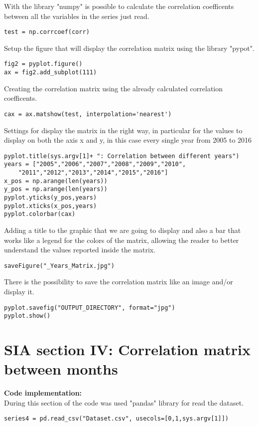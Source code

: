 With the library "numpy" is possible to calculate the correlation coefficents between all the variables in the series just read.
\begin{lstlisting}
test = np.corrcoef(corr)
\end{lstlisting}

Setup the figure that will display the correlation matrix using the library "pypot".
\begin{lstlisting}
fig2 = pyplot.figure()
ax = fig2.add_subplot(111)
\end{lstlisting}

Creating the correlation matrix using the already calculated correlation coefficents.
\begin{lstlisting}
cax = ax.matshow(test, interpolation='nearest')
\end{lstlisting}

Settings for display the matrix in the right way, in particular for the values to display on both the axis x and y, in this case every single year from 2005 to 2016
\begin{lstlisting}
pyplot.title(sys.argv[1]+ ": Correlation between different years")
years = ["2005","2006","2007","2008","2009","2010",
	"2011","2012","2013","2014","2015","2016"]
x_pos = np.arange(len(years))
y_pos = np.arange(len(years))
pyplot.yticks(y_pos,years)
pyplot.xticks(x_pos,years)
pyplot.colorbar(cax)
\end{lstlisting}
\newpage
Adding a title to the graphic that we are going to display and also a bar that works like a legend for the colors of the matrix, allowing the reader to better understand the values reported inside the matrix.
\begin{lstlisting}
saveFigure("_Years_Matrix.jpg")
\end{lstlisting}

There is the possibility to save the correlation matrix like an image and/or display it.
\begin{lstlisting}
pyplot.savefig("OUTPUT_DIRECTORY", format="jpg")
pyplot.show()
\end{lstlisting}


\section{SIA section IV: Correlation matrix between months}
\label{SIA_section_IV}
\textbf{Code implementation:}\\
During this section of the code was used "pandas" library for read the dataset.
\begin{lstlisting}
series4 = pd.read_csv("Dataset.csv", usecols=[0,1,sys.argv[1]])
\end{lstlisting}


